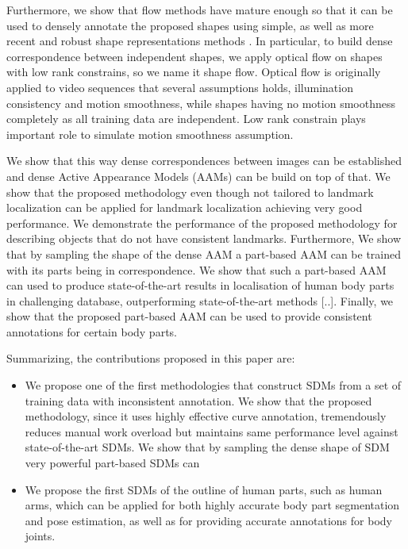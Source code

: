 Furthermore, we show that flow methods have mature enough so that it can be used to densely annotate the proposed shapes using simple, as well as more recent and robust shape representations methods \cite{Garg:2013hu,Nguyen2013}.  In particular, to build dense correspondence between independent shapes, we apply optical flow on shapes with low rank constrains, so we name it shape flow. Optical flow is originally applied to video sequences that several assumptions holds, illumination consistency and motion smoothness, while shapes having no motion smoothness completely as all training data are independent. Low rank constrain plays important role to simulate motion smoothness assumption.

We show that this way dense correspondences between images can be established and dense Active Appearance Models (AAMs) can be build on top of that. We show that the proposed methodology even though not tailored to landmark localization can be applied for landmark localization achieving very good performance. We demonstrate the performance of the proposed methodology for describing objects that do not have consistent landmarks. Furthermore, We show that by sampling the shape of the dense AAM a part-based AAM can be trained with its parts being in correspondence. We show that such a part-based AAM can used to produce state-of-the-art results in localisation of human body parts in challenging database, outperforming state-of-the-art methods [..]. Finally, we show that the proposed part-based AAM can be used to provide consistent annotations for certain body parts. 





Summarizing, the contributions proposed in this paper are:
\begin{itemize}

  \item We propose one of the first methodologies that construct SDMs from a set of training data with inconsistent annotation. We show that the proposed methodology, since it uses highly effective curve annotation, tremendously reduces manual work overload but maintains same performance level against state-of-the-art SDMs. We show that by sampling the dense shape of SDM very powerful part-based SDMs can   
  
  \item We propose the first SDMs of the outline of human parts, such as human arms, which can be applied for both highly accurate body part segmentation and pose estimation, as well as for providing accurate annotations for body joints. 
  
\end{itemize}



